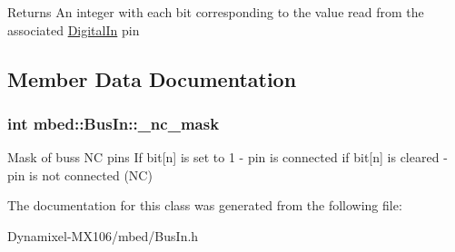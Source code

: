 \begin{DoxyReturn}{Returns}
An integer with each bit corresponding to the value read from the associated \hyperlink{classmbed_1_1_digital_in}{Digital\+In} pin 
\end{DoxyReturn}


\subsection{Member Data Documentation}
\subsubsection[{\texorpdfstring{\+\_\+nc\+\_\+mask}{_nc_mask}}]{\setlength{\rightskip}{0pt plus 5cm}int mbed\+::\+Bus\+In\+::\+\_\+nc\+\_\+mask\hspace{0.3cm}{\ttfamily [protected]}}\hypertarget{classmbed_1_1_bus_in_a3ccecbfabfbc7bcf74034264be551c3e}{}\label{classmbed_1_1_bus_in_a3ccecbfabfbc7bcf74034264be551c3e}
Mask of bus\textquotesingle{}s NC pins If bit\mbox{[}n\mbox{]} is set to 1 -\/ pin is connected if bit\mbox{[}n\mbox{]} is cleared -\/ pin is not connected (NC) 

The documentation for this class was generated from the following file\+:\begin{DoxyCompactItemize}
\item 
Dynamixel-\/\+M\+X106/mbed/Bus\+In.\+h\end{DoxyCompactItemize}

